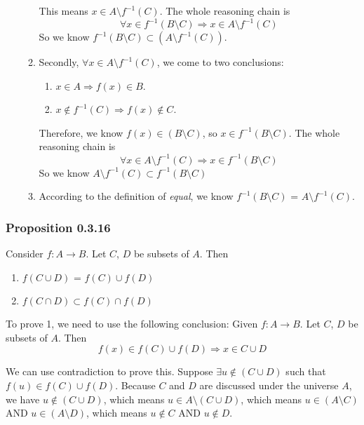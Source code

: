 \documentclass[12pt, letterpaper, oneside]{book}
\begin{document}
\begin{enumerate}
\begin{enumerate}
\begin{enumerate}
                \end{enumerate}
                This means $x \in A \setminus f^{-1}(C)$. The whole reasoning chain is
                \[
                  \forall x \in f^{-1}(B \setminus C) \Rightarrow x \in A \setminus
                  f^{-1}(C)
                \]
                So we know $f^{-1}(B \setminus C) \subset (A \setminus f^{-1}(C))$.
          \item Secondly, $\forall x \in A \setminus f^{-1}(C)$, we come to two
                conclusions:
                \begin{enumerate}
                  \item $x \in A \Rightarrow f(x) \in B$.
                  \item $x \notin f^{-1}(C) \Rightarrow f(x) \notin C$.
                \end{enumerate}
                Therefore, we know $f(x) \in (B \setminus C)$, so $x \in f^{-1}(B
                  \setminus C)$. The whole
                reasoning chain is
                \[
                  \forall x \in A \setminus f^{-1}(C) \Rightarrow x \in f^{-1}(B
                  \setminus C)
                \]
                So we know $A \setminus f^{-1}(C) \subset f^{-1}(B \setminus C)$
          \item According to the definition of \textit{equal}, we know $f^{-1}(B
                  \setminus C)$ = $A \setminus f^{-1}(C)$.
        \end{enumerate}
\end{enumerate}

\subsubsection{Proposition 0.3.16}

Consider $f: A \rightarrow B$. Let $C$, $D$ be subsets of $A$. Then
\begin{enumerate}
  \item $f(C \cup D)$ = $f(C) \cup f(D)$
  \item $f(C \cap D) \subset f(C) \cap f(D)$
\end{enumerate}

To prove 1, we need to use the following conclusion: Given $f: A \rightarrow B$.
Let $C$, $D$ be subsets of $A$. Then \[f(x) \in f(C) \cup f(D) \Rightarrow
  x \in C \cup D\]

We can use contradiction to prove this. Suppose $\exists u \notin (C \cup D)$
such that $f(u) \in f(C) \cup f(D)$. Because $C$ and $D$ are discussed under
the universe $A$, we have $u \notin (C \cup D)$, which means $u \in A \setminus
  (C \cup D)$, which means $u \in (A \setminus C)$ AND $u \in (A \setminus D)$,
which means $u \notin C$ AND $u \notin D$.
\end{document}
